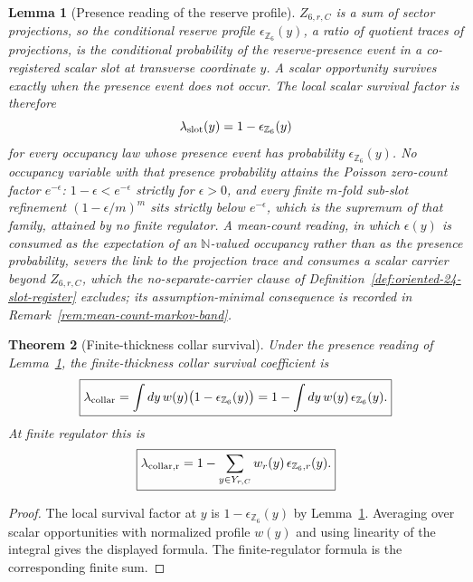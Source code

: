 \documentclass[11pt]{article}
\newtheorem{theorem}{Theorem}[section]
\newtheorem{lemma}[theorem]{Lemma}
\theoremstyle{remark}
\theoremstyle{plain}
\begin{document}
\begin{lemma}[Presence reading of the reserve profile]
\label{lem:presence-reading-reserve}
\(Z_{6,r,C}\) is a sum of sector projections, so the conditional reserve
profile \(\epsilon_{\mathbb Z_6}(y)\), a ratio of quotient traces of
projections, is the conditional probability of the reserve-presence event in a
co-registered scalar slot at transverse coordinate \(y\). A scalar opportunity
survives exactly when the presence event does not occur. The local scalar
survival factor is therefore
\[
\lambda_{\rm slot}(y)=1-\epsilon_{\mathbb Z_6}(y)
\]
for every occupancy law whose presence event has probability
\(\epsilon_{\mathbb Z_6}(y)\). No occupancy variable with that presence
probability attains the Poisson zero-count factor \(e^{-\epsilon}\):
\(1-\epsilon<e^{-\epsilon}\) strictly for \(\epsilon>0\), and every finite
\(m\)-fold sub-slot refinement \((1-\epsilon/m)^m\) sits strictly below
\(e^{-\epsilon}\), which is the supremum of that family, attained by no finite
regulator. A mean-count reading, in which \(\epsilon(y)\) is consumed as the
expectation of an \(\mathbb N\)-valued occupancy rather than as the presence
probability, severs the link to the projection trace and consumes a scalar
carrier beyond \(Z_{6,r,C}\), which the no-separate-carrier clause of
Definition~\ref{def:oriented-24-slot-register} excludes; its assumption-minimal
consequence is recorded in Remark~\ref{rem:mean-count-markov-band}.
\end{lemma}

\begin{theorem}[Finite-thickness collar survival]
\label{thm:finite-thickness-collar-survival}
Under the presence reading of Lemma~\ref{lem:presence-reading-reserve}, the
finite-thickness collar survival coefficient is
\[
\boxed{
\lambda_{\rm collar}
=
\int dy\,w(y)\bigl(1-\epsilon_{\mathbb Z_6}(y)\bigr)
=
1-\int dy\,w(y)\,\epsilon_{\mathbb Z_6}(y).
}
\]
At finite regulator this is
\[
\boxed{
\lambda_{\rm collar,r}
=
1-\sum_{y\in Y_{r,C}}w_r(y)\,\epsilon_{\mathbb Z_6,r}(y).
}
\]
\end{theorem}

\begin{proof}
The local survival factor at \(y\) is \(1-\epsilon_{\mathbb Z_6}(y)\) by
Lemma~\ref{lem:presence-reading-reserve}. Averaging over scalar opportunities
with normalized profile \(w(y)\) and using linearity of the integral gives the
displayed formula. The finite-regulator formula is the corresponding finite
sum.
\end{proof}
\end{document}
